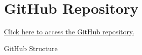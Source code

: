 \chapter{GitHub Repository}\label{app:c_github}
\href{https://github.com/zuhayrl/eee4022S_thesis}{Click here to access the GitHub repository.}

\Huge{GitHub Structure}

